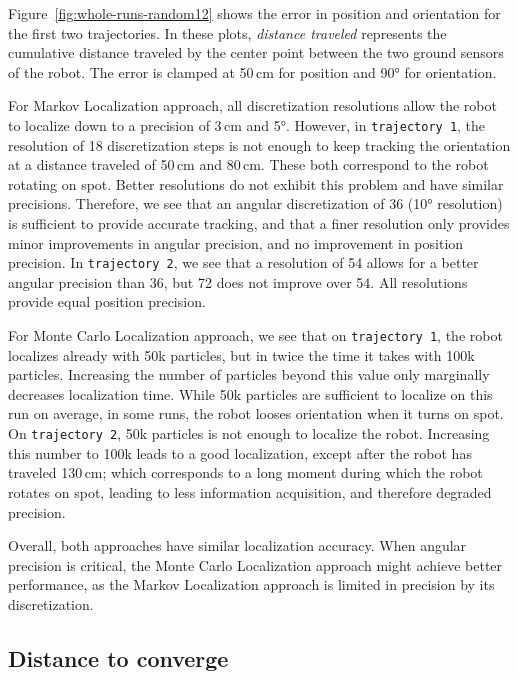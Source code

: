 \documentclass[letterpaper, 10pt, conference]{ieeeconf}
\newcommand{\Fig}[1]{Figure~\ref{fig:#1}}
\begin{document}
\Fig{whole-runs-random12} shows the error in position and orientation for the first two trajectories.
In these plots, \emph{distance traveled} represents the cumulative distance traveled by the center point between the two ground sensors of the robot.
The error is clamped at 50\,cm for position and 90° for orientation.

For Markov Localization approach, all discretization resolutions allow the robot to localize down to a precision of 3\,cm and 5°.
However, in \texttt{trajectory~1}, the resolution of 18 discretization steps is not enough to keep tracking the orientation at a distance traveled of 50\,cm and 80\,cm.
These both correspond to the robot rotating on spot.
Better resolutions do not exhibit this problem and have similar precisions.
Therefore, we see that an angular discretization of 36 (10° resolution) is sufficient to provide accurate tracking, and that a finer resolution only provides minor improvements in angular precision, and no improvement in position precision.
In \texttt{trajectory~2}, we see that a resolution of 54 allows for a better angular precision than 36, but 72 does not improve over 54.
All resolutions provide equal position precision.

For Monte Carlo Localization approach, we see that on \texttt{trajectory~1}, the robot localizes already with 50k particles, but in twice the time it takes with 100k particles.
Increasing the number of particles beyond this value only marginally decreases localization time.
While 50k particles are sufficient to localize on this run on average, in some runs, the robot looses orientation when it turns on spot.
On \texttt{trajectory~2}, 50k particles is not enough to localize the robot.
Increasing this number to 100k leads to a good localization, except after the robot has traveled 130\,cm; which corresponds to a long moment during which the robot rotates on spot, leading to less information acquisition, and therefore degraded precision.

Overall, both approaches have similar localization accuracy.
When angular precision is critical, the Monte Carlo Localization approach might achieve better performance, as the Markov Localization approach is limited in precision by its discretization.

\subsection{Distance to converge}
\end{document}
